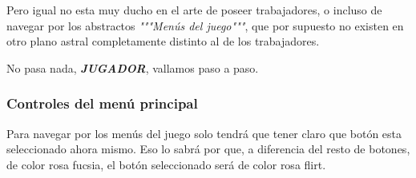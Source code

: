 Pero igual no esta muy ducho en el arte de poseer \textcolor{azulWorker}{trabajadores}, o incluso de navegar por los abstractos \textit{"""Menús del juego"""}, que por supuesto no existen en otro \textcolor{endeavour}{plano astral} completamente distinto al de los \textcolor{azulWorker}{trabajadores}.

No pasa nada, \textit{\textbf{JUGADOR}}, vallamos paso a paso.

\subsubsection{Controles del menú principal}
Para navegar por los menús del juego solo tendrá que tener claro que botón esta seleccionado ahora mismo. Eso lo sabrá por que, a diferencia del resto de botones, de color \textcolor{fucsia}{rosa fucsia}, el botón seleccionado será de color \textcolor{flirk}{rosa flirt}.

